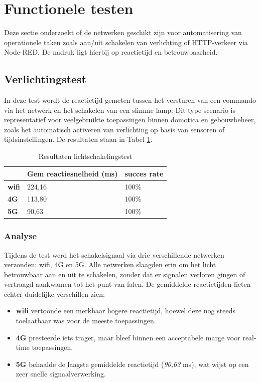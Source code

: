 \newpage
\section{Functionele testen}

Deze sectie onderzoekt of de netwerken geschikt zijn voor automatisering van operationele taken zoals aan/uit schakelen van verlichting of HTTP-verkeer via Node-RED. De nadruk ligt hierbij op reactietijd en betrouwbaarheid.

\subsection{Verlichtingstest}

In deze test wordt de reactietijd gemeten tussen het versturen van een commando via het netwerk en het schakelen van een slimme lamp. Dit type scenario is representatief voor veelgebruikte toepassingen binnen domotica en gebouwbeheer, zoals het automatisch activeren van verlichting op basis van sensoren of tijdsinstellingen. De resultaten staan in Tabel \ref{tab:licht}.

\begin{table}[]
    \caption{Resultaten lichtschakelingstest}
    \begin{tabular}{l l l}
        \cline{2-3}
        & \textbf{Gem reactiesnelheid (ms)} & \textbf{succes rate} \\ \hline
        \multicolumn{1}{l}{\textbf{wifi}} & 224,16                            & 100\%                \\ \hline
        \multicolumn{1}{l}{\textbf{4G}}   & 113,80                             & 100\%                \\ \hline
        \multicolumn{1}{l}{\textbf{5G}}   & 90,63                             & 100\%                \\ \hline
    \end{tabular}
    \label{tab:licht}
\end{table}

\subsubsection{Analyse}
Tijdens de test werd het schakelsignaal via drie verschillende netwerken verzonden: wifi, 4G en 5G. Alle netwerken slaagden erin om het licht betrouwbaar aan en uit te schakelen, zonder dat er signalen verloren gingen of vertraagd aankwamen tot het punt van falen. De gemiddelde reactietijden lieten echter duidelijke verschillen zien:
\begin{itemize}
    \item \textbf{wifi} vertoonde een merkbaar hogere reactietijd, hoewel deze nog steeds toelaatbaar was voor de meeste toepassingen.
    \item \textbf{4G} presteerde iets trager, maar bleef binnen een acceptabele marge voor real-time toepassingen.
    \item \textbf{5G} behaalde de laagste gemiddelde reactietijd (\textit{90,63} ms), wat wijst op een zeer snelle signaalverwerking.
\end{itemize}

